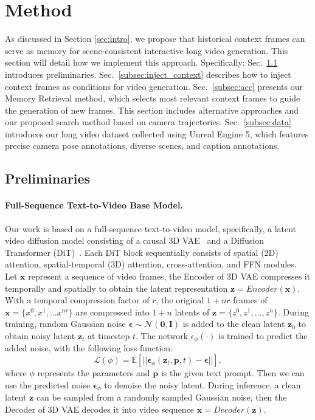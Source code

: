 \section{Method}
\label{sec:method}
As discussed in Section \ref{sec:intro}, we propose that historical context frames can serve as memory for scene-consistent interactive long video generation. This section will detail how we implement this approach. Specifically:
Sec.~\ref{subsec:preliminary} introduces preliminaries.
Sec.~\ref{subsec:inject_context} describes how to inject context frames as conditions for video generation.
Sec.~\ref{subsec:acc} presents our Memory Retrieval method, which selects most relevant context frames to guide the generation of new frames. This section includes alternative approaches and our proposed search method based on camera trajectories.
Sec.~\ref{subsec:data} introduces our long video dataset collected using Unreal Engine 5, which features precise camera pose annotations, diverse scenes, and caption annotations.

\subsection{Preliminaries}
\label{subsec:preliminary}


\paragraph{Full-Sequence Text-to-Video Base Model.} Our work is based on a full-sequence text-to-video model, specifically, a latent video diffusion model consisting of a causal 3D VAE~\cite{vae} and a Diffusion Transformer (DiT)~\cite{dit}. Each DiT block sequentially consists of spatial (2D) attention, spatial-temporal (3D) attention, cross-attention, and FFN modules.
Let $\mathbf{x}$ represent a sequence of video frames, the Encoder of 3D VAE compresses it temporally and spatially to obtain the latent representation $\mathbf{z}=Encoder(\mathbf{x})$.
With a temporal compression factor of $r$, the original $1+nr$ frames of $\mathbf{x}=\{x^0,x^1,...x^{nr}\}$ are compressed into $1+n$ latents of $\mathbf{z}=\{z^0,z^1,...,z^{n}\}$.
During training, random Gaussian noise $\boldsymbol{\epsilon}\sim\mathcal{N}(\mathbf{0},\mathbf{I})$ is added to the clean latent $\mathbf{z}_0$ to obtain noisy latent $\mathbf{z}_t$ at timestep $t$. The network $\epsilon_{\phi}(\cdot)$ is trained to predict the added noise, with the following loss function:
\begin{equation}
    \mathcal{L}(\phi)=\mathbb{E}[||\boldsymbol{\epsilon}_{\phi}(\mathbf{z}_t,\mathbf{p},t)-\boldsymbol{\epsilon}||],
\end{equation}
where $\phi$ represents the parameters and $\mathbf{p}$ is the given text prompt.
Then we can use the predicted noise $\boldsymbol{\epsilon}_{\phi}$ to denoise the noisy latent.
During inference, a clean latent $\mathbf{z}$ can be sampled from a randomly sampled Gaussian noise, then the Decoder of 3D VAE decodes it into video sequence $\mathbf{x}=Decoder(\mathbf{z})$.

